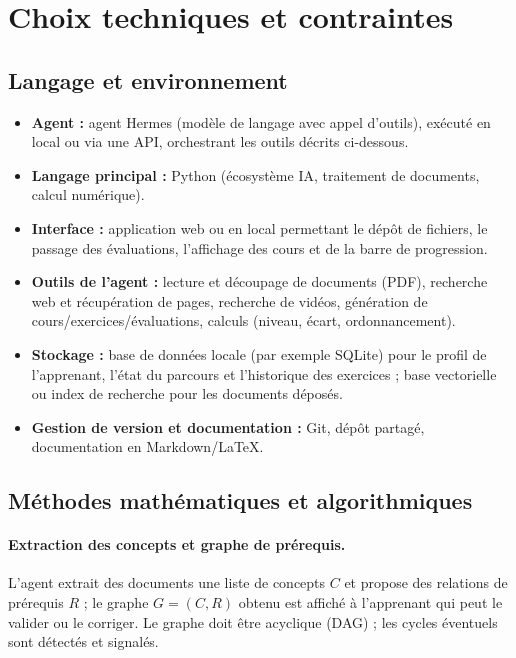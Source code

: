 \documentclass[11pt,a4paper]{article}
\begin{document}
\section{Choix techniques et contraintes}

\subsection{Langage et environnement}


\begin{itemize}[noitemsep]
  \item \textbf{Agent :} agent Hermes (modèle de langage avec appel d'outils), exécuté en local ou via une API, orchestrant les outils décrits ci-dessous.
  \item \textbf{Langage principal :} Python (écosystème IA, traitement de documents, calcul numérique).
  \item \textbf{Interface :} application web ou en local permettant le dépôt de fichiers, le passage des évaluations, l'affichage des cours et de la barre de progression.
  \item \textbf{Outils de l'agent :} lecture et découpage de documents (PDF), recherche web et récupération de pages, recherche de vidéos, génération de cours/exercices/évaluations, calculs (niveau, écart, ordonnancement).
  \item \textbf{Stockage :} base de données locale (par exemple SQLite) pour le profil de l'apprenant, l'état du parcours et l'historique des exercices ; base vectorielle ou index de recherche pour les documents déposés.
  \item \textbf{Gestion de version et documentation :} Git, dépôt partagé, documentation en Markdown/\LaTeX.
\end{itemize}

\subsection{Méthodes mathématiques et algorithmiques}

\paragraph{Extraction des concepts et graphe de prérequis.}
L'agent extrait des documents une liste de concepts $C$ et propose des relations de prérequis $R$ ; le graphe $G=(C,R)$ obtenu est affiché à l'apprenant qui peut le valider ou le corriger. Le graphe doit être acyclique (DAG) ; les cycles éventuels sont détectés et signalés.
\end{document}
